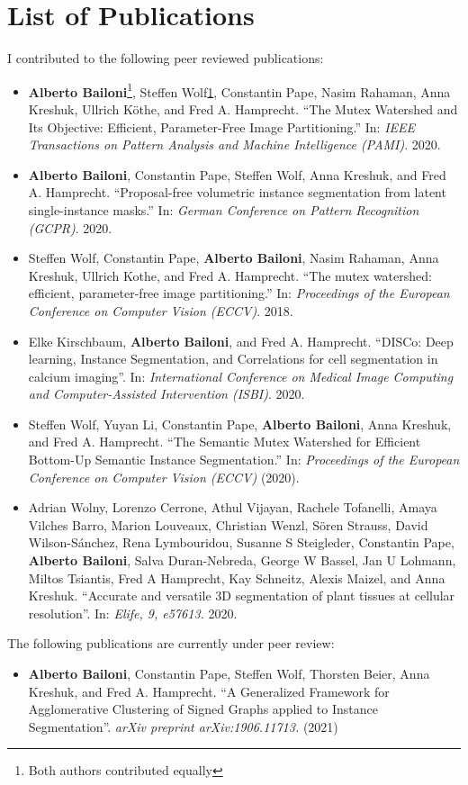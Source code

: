 

\chapter*{List of Publications}

I contributed to the following peer reviewed publications:

\begin{itemize}
\item \textbf{Alberto Bailoni}\footnote{Both authors contributed equally\label{note1}}, Steffen Wolf\cref{note1}, Constantin Pape, Nasim Rahaman, Anna Kreshuk, Ullrich Köthe, and Fred A. Hamprecht. ``The Mutex Watershed and Its Objective: Efficient, Parameter-Free Image Partitioning.'' In: \emph{IEEE Transactions on Pattern Analysis and Machine Intelligence (PAMI)}. 2020.
\item \textbf{Alberto Bailoni}, Constantin Pape, Steffen Wolf, Anna Kreshuk, and Fred A. Hamprecht. ``Proposal-free volumetric instance segmentation from latent single-instance masks.'' In: \emph{ German Conference on Pattern Recognition (GCPR)}. 2020.
\item Steffen Wolf, Constantin Pape, \textbf{Alberto Bailoni}, Nasim Rahaman, Anna Kreshuk, Ullrich Kothe, and Fred A. Hamprecht. ``The mutex watershed: efficient, parameter-free image partitioning.'' In: \emph{Proceedings of the European Conference on Computer Vision (ECCV)}. 2018.
\item Elke Kirschbaum, \textbf{Alberto Bailoni}, and Fred A. Hamprecht. ``DISCo: Deep learning, Instance Segmentation, and Correlations for cell segmentation in calcium imaging''. In: \emph{International Conference on Medical Image Computing and Computer-Assisted Intervention (ISBI)}. 2020.
\item Steffen Wolf, Yuyan Li, Constantin Pape, \textbf{Alberto Bailoni}, Anna Kreshuk, and Fred A. Hamprecht. ``The Semantic Mutex Watershed for Efficient Bottom-Up Semantic Instance Segmentation.'' In: \emph{Proceedings of the European Conference on Computer Vision (ECCV)} (2020).
\item Adrian Wolny, Lorenzo Cerrone, Athul Vijayan, Rachele Tofanelli, Amaya Vilches Barro, Marion Louveaux, Christian Wenzl, Sören Strauss, David Wilson-Sánchez, Rena Lymbouridou, Susanne S Steigleder, Constantin Pape, \textbf{Alberto Bailoni}, Salva Duran-Nebreda, George W Bassel, Jan U Lohmann, Miltos Tsiantis, Fred A Hamprecht, Kay Schneitz, Alexis Maizel, and Anna Kreshuk. ``Accurate and versatile 3D segmentation of plant tissues at cellular resolution''. In: \emph{Elife, 9, e57613.} 2020.
\end{itemize}

\noindent The following publications are currently under peer review:
\begin{itemize}
\item \textbf{Alberto Bailoni}, Constantin Pape, Steffen Wolf, Thorsten Beier, Anna Kreshuk, and Fred A. Hamprecht. ``A Generalized Framework for Agglomerative Clustering of Signed Graphs applied to Instance Segmentation''. \emph{arXiv preprint arXiv:1906.11713.} (2021)
\end{itemize}
